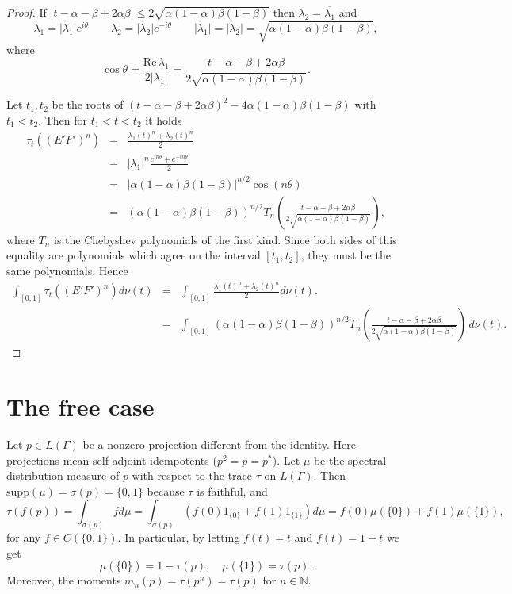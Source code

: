 \documentclass{amsart}
\newcommand{\N}{\mathbb N}
\newcommand{\supp}{\mathrm{supp }}
\theoremstyle{definition}
\begin{document}
\begin{proof}
If $|t-\alpha -\beta +2\alpha \beta |\le 2\sqrt{\alpha (1-\alpha )\beta (1-\beta )}$ then $\lambda_2=\overline{\lambda_1}$ and
$$\lambda_1=|\lambda_1|e^{i\theta}\qquad \lambda_2=|\lambda_2|e^{-i\theta} \qquad |\lambda_1|=|\lambda_2|=\sqrt{\alpha (1-\alpha )\beta (1-\beta )},$$
where
$$\cos\theta=\frac{\mathrm{Re\, }\lambda_1}{2|\lambda_1|}=\frac{t-\alpha -\beta +2\alpha \beta }{2\sqrt{\alpha (1-\alpha )\beta (1-\beta )}}.$$

Let $t_1,t_2$ be the roots of $(t-\alpha -\beta +2\alpha \beta )^2-4\alpha (1-\alpha )\beta (1-\beta )$
with $t_1<t_2$.
Then for $t_1< t< t_2$ it holds
\begin{eqnarray*}
\tau_t((E'F')^n)&=&\frac{\lambda_1(t)^n+\lambda_2(t)^n}{2}\\
&=&|\lambda_1|^n\frac{e^{in\theta }+e^{-in\theta }}{2}\\
&=&|\alpha (1-\alpha )\beta (1-\beta )|^{n/2}\cos(n\theta)\\
&=&(\alpha (1-\alpha )\beta (1-\beta ))^{n/2}T_n(\frac{t-\alpha -\beta +2\alpha \beta }{2\sqrt{\alpha (1-\alpha )\beta (1-\beta )}}),
\end{eqnarray*}
where $T_n$ is the Chebyshev polynomials of the first kind.
Since both sides of this equality are polynomials which agree on the interval $[t_1,t_2]$, they must be the same polynomials.
Hence
\begin{eqnarray*}
\int_{[0,1]}\tau_t((E'F')^n)d\nu(t)&=&\int_{[0,1]} \frac{\lambda_1(t)^n+\lambda_2(t)^n}{2}d\nu(t).\\
&=&\int_{[0,1]}(\alpha (1-\alpha )\beta (1-\beta ))^{n/2}T_n(\frac{t-\alpha -\beta +2\alpha \beta }{2\sqrt{\alpha (1-\alpha )\beta (1-\beta )}})\,d\nu(t).
\end{eqnarray*}
\end{proof}



 
 \section{\textbf{The free case}}\label{s:free}
Let $p\in L(\Gamma)$ be a nonzero projection different from the identity. Here projections mean self-adjoint idempotents ($p^2=p=p^*$). 
Let $\mu$  be the spectral distribution measure of $p$  with respect to the trace $\tau$ on $L(\Gamma)$. 
Then $\supp(\mu)=\sigma(p)=\{0,1\}$ because $\tau$ is faithful, and 
$$\tau(f(p))=\int_{\sigma(p)}f d{\mu}=\int_{\sigma(p)}(f(0)1_{\{0\}}+f(1)1_{\{1\}})d{\mu}=f(0)\mu(\{0\})+f(1)\mu(\{1\}),$$
for any $f\in C(\{0,1\})$.
In particular, by letting $f(t)=t$ and $f(t)=1-t$ we get
$$\mu(\{0\})=1-\tau(p),\quad \mu(\{1\})=\tau(p).$$
Moreover, the moments $m_n(p)=\tau(p^n)=\tau(p)$ for $n\in\N$.
\end{document}
